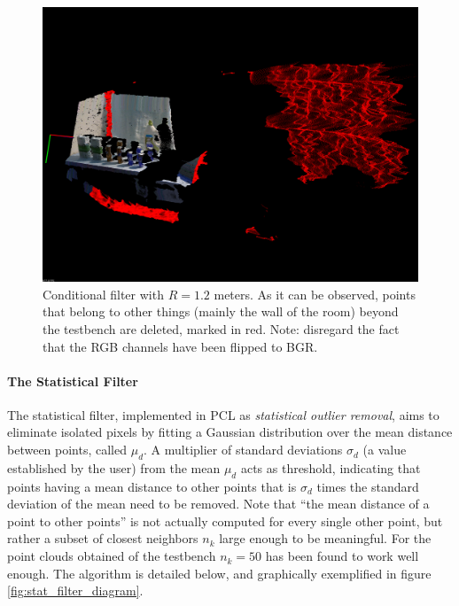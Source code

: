 \documentclass[../main.tex]{subfiles}
\begin{document}
\begin{figure}[htbp]
    \centering
    \includegraphics[width=1\textwidth]{images/conditional_filter_testbench.png}
    \caption{Conditional filter with $R=1.2$ meters. As it can be observed, points that belong to other things (mainly the wall of the room) beyond the testbench are deleted, marked in red. Note: disregard the fact that the RGB channels have been flipped to BGR.}
    \label{fig:conditional_filter_testbench}
\end{figure}

\paragraph{The Statistical Filter}
The statistical filter, implemented in PCL as \emph{statistical outlier removal}, aims to eliminate isolated pixels by fitting a Gaussian distribution over the mean distance between points, called $\mu_{d}$. A multiplier of standard deviations $\sigma_{d}$ (a value established by the user) from the mean $\mu_{d}$ acts as threshold, indicating that points having a mean distance to other points that is $\sigma_{d}$ times the standard deviation of the mean need to be removed. Note that ``the mean distance of a point to other points'' is not actually computed for every single other point, but rather a subset of closest neighbors $n_{k}$ large enough to be meaningful. For the point clouds obtained of the testbench $n_{k}=50$ has been found to work well enough. The algorithm is detailed below, and graphically exemplified in figure \ref{fig:stat_filter_diagram}.
\end{document}
